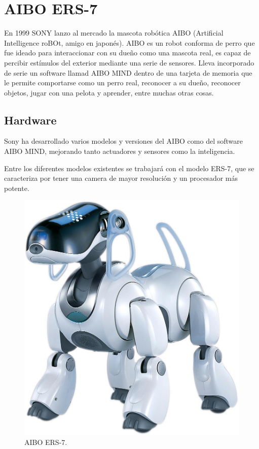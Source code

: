 \documentclass[12pt,a4paper,final,twoside]{book}
\begin{document}
\chapter{AIBO ERS-7}\label{secaibo}
\thispagestyle{fancy}
En 1999 SONY lanzo al mercado la mascota robótica AIBO (Artificial Intelligence roBOt, amigo en japonés). AIBO es un robot conforma de perro 
que fue ideado para interaccionar con su dueño como una mascota real, es capaz de percibir estímulos del exterior mediante una serie de sensores. Lleva incorporado de serie un software llamad AIBO MIND dentro de una tarjeta de memoria que le permite comportarse como un perro real, reconocer a su dueño, reconocer objetos, jugar con una pelota y aprender, entre muchas otras cosas.


\section{Hardware}
Sony ha desarrollado varios modelos y versiones del AIBO como del software AIBO MIND, mejorando tanto actuadores y sensores como la inteligencia.

Entre los diferentes modelos existentes se trabajará con el modelo ERS-7, que se caracteriza por tener una camera de mayor resolución y un procesador más potente.

\begin{figure}[h!]
	\centering
    \includegraphics[scale=0.1]	{images/ers7lrg}
	 \caption{AIBO ERS-7.}
  \label{fig:ers7}
\end{figure}	
\end{document}
